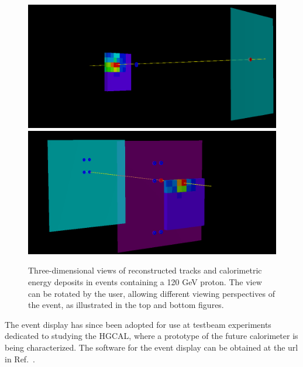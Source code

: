 \begin{figure}[h]\centering
\includegraphics[width=0.8\linewidth]{figures/CMS/Upgrade/3D_50.png}\\
\vspace{0.8cm}
\includegraphics[width=0.8\linewidth]{figures/CMS/Upgrade/3D_14.png}
\vspace{0.8cm}
\caption{Three-dimensional views of reconstructed tracks and calorimetric energy deposits in events containing a 120 GeV proton. The view can be rotated by the user, allowing different viewing perspectives of the event, as illustrated in the top and bottom figures.}
\label{fig:Shashlik3d}
\end{figure}
\noindent
The event display has since been adopted for use at testbeam experiments dedicated to studying the HGCAL, where a prototype of the future calorimeter is being characterized. The software for the event display can be obtained at the url in Ref.~\cite{bib:EventDisplay}. 

